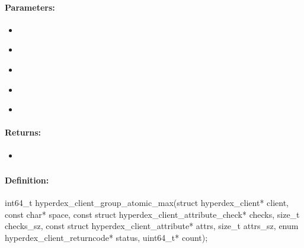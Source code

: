\paragraph{Parameters:}
\begin{itemize}[noitemsep]
\item {}\\

\item {}\\

\item {}\\

\item {}\\

\item {}\\

\end{itemize}

\paragraph{Returns:}
\begin{itemize}[noitemsep]
\item {}\\

\end{itemize}

\pagebreak
\subsubsection{}
\label{api:c:group_atomic_max}


\paragraph{Definition:}
\begin{ccode}
int64_t hyperdex_client_group_atomic_max(struct hyperdex_client* client,
        const char* space,
        const struct hyperdex_client_attribute_check* checks, size_t checks_sz,
        const struct hyperdex_client_attribute* attrs, size_t attrs_sz,
        enum hyperdex_client_returncode* status,
        uint64_t* count);
\end{ccode}

